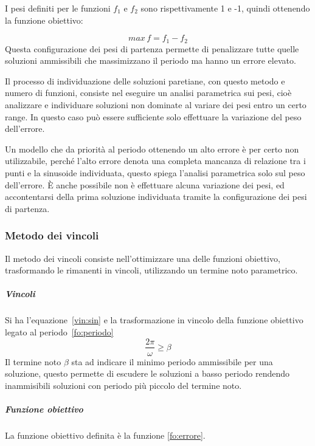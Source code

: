 \documentclass[a4paper,12pt]{report}
\begin{document}
I pesi definiti per le funzioni $ f_1 $ e $ f_2 $ sono rispettivamente 1 e -1, quindi ottenendo la funzione obiettivo:

\begin{equation}
max \, f = f_1 - f_2
\end{equation}
Questa configurazione dei pesi di partenza permette di penalizzare tutte quelle soluzioni ammissibili che massimizzano il periodo ma hanno un errore elevato.

Il processo di individuazione delle soluzioni paretiane, con questo metodo e numero di funzioni, consiste nel eseguire un analisi parametrica sui pesi, cioè analizzare e individuare soluzioni non dominate al variare dei pesi entro un certo range. In questo caso può essere sufficiente solo effettuare la variazione del peso dell'errore.

Un modello che da priorità al periodo ottenendo un alto errore è per certo non utilizzabile, perché l'alto errore denota una completa mancanza di relazione tra i punti e la sinusoide individuata, questo spiega l'analisi parametrica solo sul peso dell'errore. È anche possibile non è effettuare alcuna variazione dei pesi, ed accontentarsi della prima soluzione individuata tramite la configurazione dei pesi di partenza.

\subsubsection{Metodo dei vincoli}
Il metodo dei vincoli consiste nell'ottimizzare una delle funzioni obiettivo, trasformando le rimanenti in vincoli, utilizzando un termine noto parametrico.

\subparagraph{Vincoli} Si ha l'equazione~\eqref{vin:sin} e la trasformazione in vincolo della funzione obiettivo legato al periodo~\eqref{fo:periodo}
\begin{equation}
\label{vin:periodo}
\frac{2\pi}{\omega} \ge \beta
\end{equation}
Il termine noto $ \beta $ sta ad indicare il minimo periodo ammissibile per una soluzione, questo permette di escudere le soluzioni a basso periodo rendendo inammisibili soluzioni con periodo più piccolo del termine noto.

\subparagraph{Funzione obiettivo}
La funzione obiettivo definita è la funzione \eqref{fo:errore}.
\end{document}
